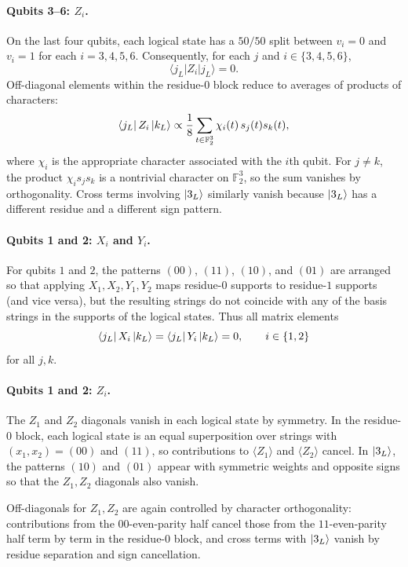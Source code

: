 \documentclass[pdflatex,sn-nature]{sn-jnl}%
\theoremstyle{thmstyleone}%
\theoremstyle{thmstyletwo}%
\theoremstyle{thmstylethree}%
\begin{document}
\begin{appendices}
\paragraph{Qubits 3--6: $Z_i$.}
On the last four qubits, each logical state has a $50/50$ split between $v_i=0$ and $v_i=1$ for each $i=3,4,5,6$. Consequently, for each $j$ and $i\in\{3,4,5,6\}$,
\[
    \langle j_L|Z_i|j_L\rangle=0.
\]
Off-diagonal elements within the residue-$0$ block reduce to averages of products of characters:
\[
    \bra{j_L}Z_i\ket{k_L}
      \propto \frac{1}{8}\sum_{t\in\mathbb F_2^3} \chi_i(t)\,s_j(t)s_k(t),
\]
where $\chi_i$ is the appropriate character associated with the $i$th qubit. For $j\neq k$, the product $\chi_i s_j s_k$ is a nontrivial character on $\mathbb{F}_2^3$, so the sum vanishes by orthogonality. Cross terms involving $\ket{3_L}$ similarly vanish because $\ket{3_L}$ has a different residue and a different sign pattern.

\paragraph{Qubits 1 and 2: $X_i$ and $Y_i$.}
For qubits $1$ and $2$, the patterns $(00)$, $(11)$, $(10)$, and $(01)$ are arranged so that applying $X_1,X_2,Y_1,Y_2$ maps residue-$0$ supports to residue-$1$ supports (and vice versa), but the resulting strings do not coincide with any of the basis strings in the supports of the logical states. Thus all matrix elements
\[
    \bra{j_L}X_i\ket{k_L}
    =\bra{j_L}Y_i\ket{k_L}=0,\qquad i\in\{1,2\}
\]
for all $j,k$.

\paragraph{Qubits 1 and 2: $Z_i$.}
The $Z_1$ and $Z_2$ diagonals vanish in each logical state by symmetry. In the residue-$0$ block, each logical state is an equal superposition over strings with $(x_1,x_2)=(00)$ and $(11)$, so contributions to $\langle Z_1\rangle$ and $\langle Z_2\rangle$ cancel. In $\ket{3_L}$, the patterns $(10)$ and $(01)$ appear with symmetric weights and opposite signs so that the $Z_1,Z_2$ diagonals also vanish.

Off-diagonals for $Z_1,Z_2$ are again controlled by character orthogonality: contributions from the $00$-even-parity half cancel those from the $11$-even-parity half term by term in the residue-$0$ block, and cross terms with $\ket{3_L}$ vanish by residue separation and sign cancellation.


\end{appendices}
\end{document}
